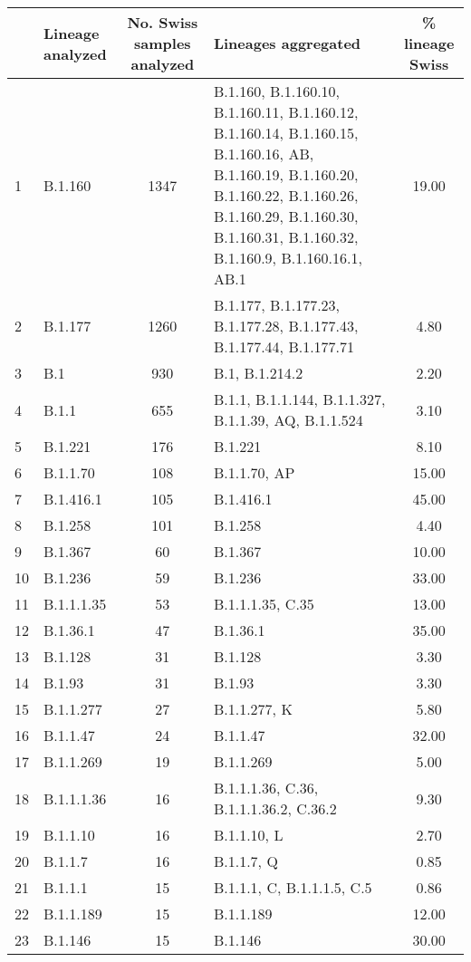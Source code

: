 \begin{longtable}{llcp{4cm}c}
  \hline
 & Lineage analyzed & No. Swiss samples analyzed & Lineages aggregated & \% lineage Swiss \\ 
  \hline
1 & B.1.160 & 1347 & B.1.160, B.1.160.10, B.1.160.11, B.1.160.12, B.1.160.14, B.1.160.15, B.1.160.16, AB, B.1.160.19, B.1.160.20, B.1.160.22, B.1.160.26, B.1.160.29, B.1.160.30, B.1.160.31, B.1.160.32, B.1.160.9, B.1.160.16.1, AB.1 & 19.00 \\ 
  2 & B.1.177 & 1260 & B.1.177, B.1.177.23, B.1.177.28, B.1.177.43, B.1.177.44, B.1.177.71 & 4.80 \\ 
  3 & B.1 & 930 & B.1, B.1.214.2 & 2.20 \\ 
  4 & B.1.1 & 655 & B.1.1, B.1.1.144, B.1.1.327, B.1.1.39, AQ, B.1.1.524 & 3.10 \\ 
  5 & B.1.221 & 176 & B.1.221 & 8.10 \\ 
  6 & B.1.1.70 & 108 & B.1.1.70, AP & 15.00 \\ 
  7 & B.1.416.1 & 105 & B.1.416.1 & 45.00 \\ 
  8 & B.1.258 & 101 & B.1.258 & 4.40 \\ 
  9 & B.1.367 &  60 & B.1.367 & 10.00 \\ 
  10 & B.1.236 &  59 & B.1.236 & 33.00 \\ 
  11 & B.1.1.1.35 &  53 & B.1.1.1.35, C.35 & 13.00 \\ 
  12 & B.1.36.1 &  47 & B.1.36.1 & 35.00 \\ 
  13 & B.1.128 &  31 & B.1.128 & 3.30 \\ 
  14 & B.1.93 &  31 & B.1.93 & 3.30 \\ 
  15 & B.1.1.277 &  27 & B.1.1.277, K & 5.80 \\ 
  16 & B.1.1.47 &  24 & B.1.1.47 & 32.00 \\ 
  17 & B.1.1.269 &  19 & B.1.1.269 & 5.00 \\ 
  18 & B.1.1.1.36 &  16 & B.1.1.1.36, C.36, B.1.1.1.36.2, C.36.2 & 9.30 \\ 
  19 & B.1.1.10 &  16 & B.1.1.10, L & 2.70 \\ 
  20 & B.1.1.7 &  16 & B.1.1.7, Q & 0.85 \\ 
  21 & B.1.1.1 &  15 & B.1.1.1, C, B.1.1.1.5, C.5 & 0.86 \\ 
  22 & B.1.1.189 &  15 & B.1.1.189 & 12.00 \\ 
  23 & B.1.146 &  15 & B.1.146 & 30.00 \\ 

\end{longtable}
